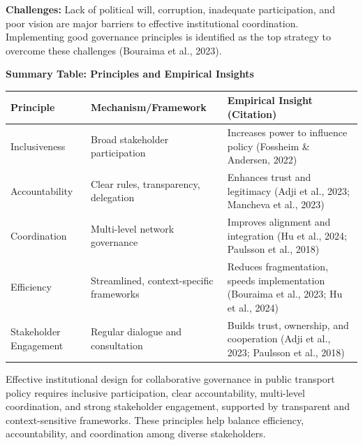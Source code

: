 \textbf{Challenges:} Lack of political will, corruption, inadequate
participation, and poor vision are major barriers to effective
institutional coordination. Implementing good governance principles is
identified as the top strategy to overcome these challenges (Bouraima et
al., 2023).

\textbf{Summary Table: Principles and Empirical Insights}

{\def\LTcaptype{none} %
\begin{longtable}[]{@{}
  >{\raggedright\arraybackslash}p{}
  >{\raggedright\arraybackslash}p{}
  >{\raggedright\arraybackslash}p{}@{}}
\toprule\noalign{}
\begin{minipage}[b]{\linewidth}\raggedright
Principle
\end{minipage} & \begin{minipage}[b]{\linewidth}\raggedright
Mechanism/Framework
\end{minipage} & \begin{minipage}[b]{\linewidth}\raggedright
Empirical Insight (Citation)
\end{minipage} \\
\midrule\noalign{}
\endhead
\bottomrule\noalign{}
\endlastfoot
Inclusiveness & Broad stakeholder participation & Increases power to
influence policy (Fossheim \& Andersen, 2022) \\
Accountability & Clear rules, transparency, delegation & Enhances trust
and legitimacy (Adji et al., 2023; Mancheva et al., 2023) \\
Coordination & Multi-level network governance & Improves alignment and
integration (Hu et al., 2024; Paulsson et al., 2018) \\
Efficiency & Streamlined, context-specific frameworks & Reduces
fragmentation, speeds implementation (Bouraima et al., 2023; Hu et al.,
2024) \\
Stakeholder Engagement & Regular dialogue and consultation & Builds
trust, ownership, and cooperation (Adji et al., 2023; Paulsson et al.,
2018) \\
\end{longtable}
}

Effective institutional design for collaborative governance in public
transport policy requires inclusive participation, clear accountability,
multi-level coordination, and strong stakeholder engagement, supported
by transparent and context-sensitive frameworks. These principles help
balance efficiency, accountability, and coordination among diverse
stakeholders.

